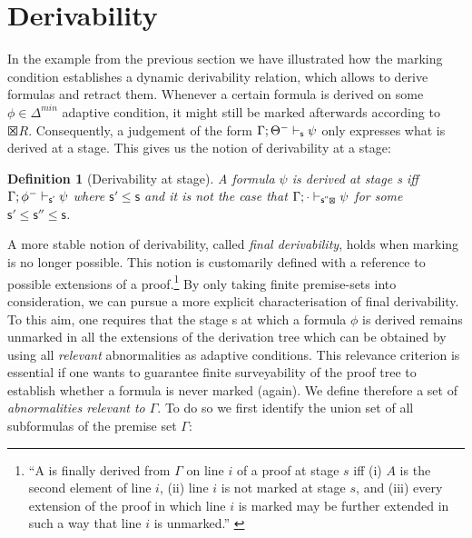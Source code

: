 \documentclass[]{article}
\newtheorem{definition}{Definition}
\newcommand{\Turn}[2]
    { {#1}\vdash_{\textbf{\sf s}}  {#2}}
\newcommand{\TurnPrime}[2]
    { {#1}\vdash_{\textbf{\sf s'}}  {#2}}
\newcommand{\TurnMarked}[2]
    { {#1}\vdash_{\textbf{\sf s\XBox}}  {#2}}
\newcommand{\TurnPrimePrimeMarked}[2]
        { {#1}\vdash_{\textbf{\sf s''\XBox}}  {#2}}
\begin{document}
\section{Derivability}\label{sec:meta}

In the example from the previous section we have illustrated how the marking condition establishes a dynamic derivability relation, which allows to derive formulas and retract them. Whenever a certain formula is derived on some $\phi\in \Delta^{min}$ adaptive condition, it might still be marked afterwards according to $\XBox R$. Consequently, a judgement of the form $\Turn{\Gamma; \Theta^-}{\psi}$ only expresses what is derived at a stage. This gives us the notion of derivability at a stage:

\begin{definition}[Derivability at stage]
A formula $\psi$ is derived at stage {\sf s}  iff $\TurnPrime{\Gamma; \phi^{-}}{\psi}$ where $\mathsf{s'\leq s}$ and it is not the case that $\TurnPrimePrimeMarked{\Gamma; \cdot}{\psi}$ for some $\mathsf{s'\leq s''\leq s}$.
\end{definition}

A more stable notion of derivability, called \emph{final derivability}, holds when marking is no longer possible. This notion is customarily defined with a reference to possible extensions of a proof.\footnote{``A is finally derived from $\Gamma$ on line $i$ of a proof at stage $s$ iff (i) $A$ is the second element of line $i$, (ii) line $i$ is not marked at stage $s$, and (iii) every extension of the proof in which line $i$ is marked may be further extended in such a way that line $i$ is unmarked.'' \cite[229]{batens07}} By only taking finite premise-sets into consideration, we can pursue a more explicit characterisation of final derivability.
%
%
To this aim, one requires that the stage {\sf s} at which a formula $\phi$ is derived remains unmarked in all the extensions of the derivation tree which can be obtained by using all \textit{relevant} abnormalities as adaptive conditions. This relevance criterion is essential if one wants to guarantee finite surveyability of the proof tree to establish whether a formula is never marked (again). We define therefore a set of \textit{abnormalities relevant to $\Gamma$}. To do so we first identify the union set of all subformulas of the premise set $\Gamma$:
\end{document}
